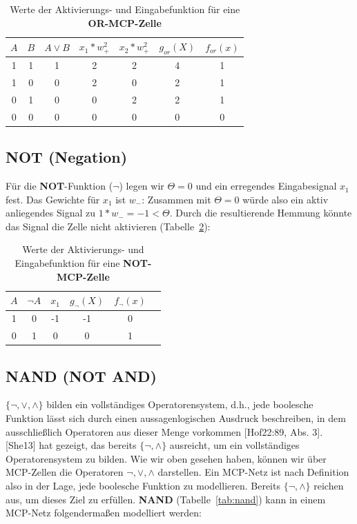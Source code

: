 {\begin{table} %
    \centering
    \begin{tabular}{c | c | c |c | c | c|c}
 $A$ & $B$ & $A \lor B$ & $x_1*w^2_+$ & $x_2*w^2_+$ & $g_{or}(X)$ & $f_{or}(x)$ \\
\hline
 1   & 1   & 1          & 2     & 2     & 4           & 1            \\
 1   & 0   & 0          & 2     & 0     & 2           & 1            \\
 0   & 1   & 0          & 0     & 2     & 2           & 1            \\
 0   & 0   & 0          & 0     & 0     & 0           & 0            \\
\end{tabular}
\caption{Werte der Aktivierungs- und Eingabefunktion für eine \textbf{OR-MCP-Zelle}}
\label{tab:mcp-or}
\end{table}

\subsection*{NOT (Negation)}

Für die \textbf{NOT}-Funktion ($\neg$) legen wir $\Theta = 0$ und ein erregendes Eingabesignal $x_1$ fest. Das Gewichte für $x_1$ ist $w_-$: Zusammen mit $\Theta = 0$ würde also ein aktiv anliegendes Signal zu $1 * w_-=-1 < \Theta$. Durch die resultierende Hemmung könnte das Signal die Zelle nicht aktivieren (Tabelle~\ref{tab:mcp-neg}):


\begin{table} %
    \centering
    \begin{tabular}{c | c | c |c | c | c}
        $A$ & $\neg A$ & $x_1$ & $g_{\neg}(X)$ & $f_{\neg}(x)$  \\
        \hline
         1   & 0        & -1     &  -1             & 0             \\
         0   & 1        & 0     &  0             &  1             \\
    \end{tabular}
    \caption{Werte der Aktivierungs- und Eingabefunktion für eine \textbf{NOT-MCP-Zelle}}
    \label{tab:mcp-neg}
\end{table}


\subsection*{NAND (NOT AND)}

$\{\neg, \lor, \land\}$ bilden ein vollständiges Operatorensystem, d.h., jede boolesche Funktion lässt sich durch einen aussagenlogischen Ausdruck  beschreiben, in dem ausschließlich Operatoren aus dieser Menge vorkommen [Hof22:89, Abs. 3].
[She13] hat gezeigt, das bereits $\{\neg, \land\}$  ausreicht, um ein vollständiges Operatorensystem zu bilden.
Wie wir oben gesehen haben, können wir über MCP-Zellen die Operatoren $\neg, \lor, \land$ darstellen.
Ein MCP-Netz ist nach Definition also in der Lage, jede boolesche Funktion zu modellieren.
Bereits $\{\neg, \land\}$ reichen aus, um dieses Ziel zu erfüllen. \textbf{NAND} (Tabelle~\ref{tab:nand}) kann in einem MCP-Netz folgendermaßen modelliert werden:

}
